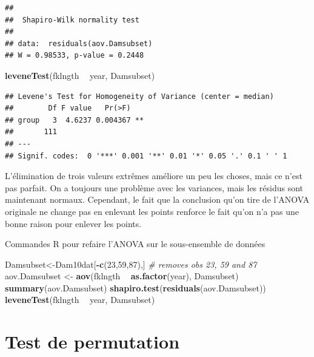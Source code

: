 \documentclass[12pt,]{book}
\newenvironment{Shaded}{\begin{snugshade}}{\end{snugshade}}
\newcommand{\CommentTok}[1]{\textcolor[rgb]{0.37,0.37,0.37}{\textit{#1}}}
\newcommand{\DecValTok}[1]{\textcolor[rgb]{0.06,0.06,0.06}{#1}}
\newcommand{\KeywordTok}[1]{\textcolor[rgb]{0.27,0.27,0.27}{\textbf{#1}}}
\newcommand{\NormalTok}[1]{#1}
\newcommand{\OperatorTok}[1]{\textcolor[rgb]{0.43,0.43,0.43}{\textbf{#1}}}
\newcommand{\StringTok}[1]{\textcolor[rgb]{0.5,0.5,0.5}{#1}}
\begin{document}
\begin{verbatim}
## 
## 	Shapiro-Wilk normality test
## 
## data:  residuals(aov.Damsubset)
## W = 0.98533, p-value = 0.2448
\end{verbatim}

\begin{Shaded}
\begin{Highlighting}[]
\KeywordTok{leveneTest}\NormalTok{(fklngth }\OperatorTok{~}\StringTok{ }\NormalTok{year, Damsubset)}
\end{Highlighting}
\end{Shaded}

\begin{verbatim}
## Levene's Test for Homogeneity of Variance (center = median)
##        Df F value   Pr(>F)   
## group   3  4.6237 0.004367 **
##       111                    
## ---
## Signif. codes:  0 '***' 0.001 '**' 0.01 '*' 0.05 '.' 0.1 ' ' 1
\end{verbatim}

L'élimination de trois valeurs extrêmes améliore un peu les choses, mais ce n'est pas parfait. On a toujours une problème avec les variances, mais les résidus sont maintenant normaux. Cependant, le fait que la conclusion qu'on tire de l'ANOVA originale ne change pas en enlevant les points renforce le fait qu'on n'a pas une bonne raison pour enlever les points.

Commandes R pour refaire l'ANOVA sur le sous-ensemble de données

\begin{Shaded}
\begin{Highlighting}[]
\NormalTok{Damsubset<-Dam10dat[}\OperatorTok{-}\KeywordTok{c}\NormalTok{(}\DecValTok{23}\NormalTok{,}\DecValTok{59}\NormalTok{,}\DecValTok{87}\NormalTok{),]}
\CommentTok{# removes obs 23, 59 and 87}
\NormalTok{aov.Damsubset <-}\StringTok{ }\KeywordTok{aov}\NormalTok{(fklngth }\OperatorTok{~}\StringTok{ }\KeywordTok{as.factor}\NormalTok{(year), Damsubset)}
\KeywordTok{summary}\NormalTok{(aov.Damsubset)}
\KeywordTok{shapiro.test}\NormalTok{(}\KeywordTok{residuals}\NormalTok{(aov.Damsubset))}
\KeywordTok{leveneTest}\NormalTok{(fklngth }\OperatorTok{~}\StringTok{ }\NormalTok{year, Damsubset)}
\end{Highlighting}
\end{Shaded}

\hypertarget{test-de-permutation}{%
\section{Test de permutation}\label{test-de-permutation}}
\end{document}
